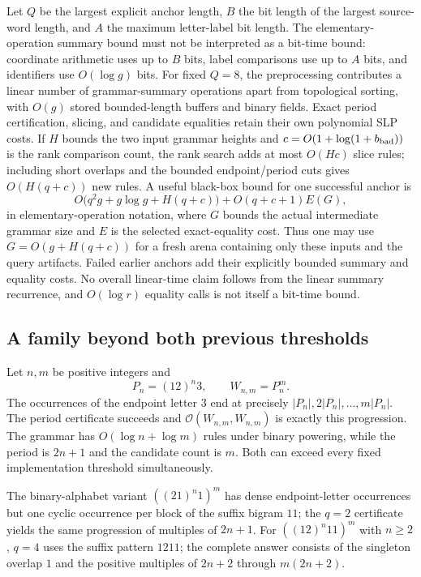 Let $Q$ be the largest explicit anchor length, $B$ the bit length of the
largest source-word length, and $A$ the maximum letter-label bit length.
The elementary-operation summary bound must not be interpreted as a bit-time
bound: coordinate arithmetic uses up to $B$ bits, label comparisons use up
to $A$ bits, and identifiers use $O(\log g)$ bits.  For fixed $Q=8$, the
preprocessing contributes a linear number of grammar-summary operations
apart from topological sorting, with $O(g)$ stored bounded-length buffers
and binary fields.  Exact period certification, slicing, and candidate
equalities retain their own polynomial SLP costs.  If $H$ bounds the two
input grammar heights and $c=O(1+\log(1+b_{\rm bad}))$ is the rank comparison
count, the rank search adds at most $O(Hc)$ slice rules; including short
overlaps and the bounded endpoint/period cuts gives $O(H(q+c))$ new rules.
A useful black-box bound for one successful anchor is
\[
 O\bigl(q^2g+g\log g+H(q+c)\bigr)+O(q+c+1)E(G),
\]
in elementary-operation notation, where $G$ bounds the actual intermediate
grammar size and $E$ is the selected exact-equality cost.  Thus one may use
$G=O(g+H(q+c))$ for a fresh arena containing only these inputs and the query
artifacts.  Failed earlier anchors add their explicitly bounded summary and
equality costs.  No overall linear-time claim follows from the linear summary
recurrence, and $O(\log r)$ equality calls is not itself a bit-time bound.

\subsection{A family beyond both previous thresholds}

Let $n,m$ be positive integers and
\[
 P_n=(12)^n3,\qquad W_{n,m}=P_n^m.
\]
The occurrences of the endpoint letter $3$ end at precisely
$|P_n|,2|P_n|,\ldots,m|P_n|$.  The period certificate succeeds and
$\mathcal O(W_{n,m},W_{n,m})$ is exactly this progression.  The grammar
has $O(\log n+\log m)$ rules under binary powering, while the period is
$2n+1$ and the candidate count is $m$.  Both can exceed every fixed
implementation threshold simultaneously.

The binary-alphabet variant $((21)^n1)^m$ has dense endpoint-letter
occurrences but one cyclic occurrence per block of the suffix bigram $11$;
the $q=2$ certificate yields the same progression of multiples of $2n+1$.
For $((12)^n11)^m$ with $n\geq2$, $q=4$ uses the suffix pattern $1211$;
the complete answer consists of the singleton overlap $1$ and the positive
multiples of $2n+2$ through $m(2n+2)$.

